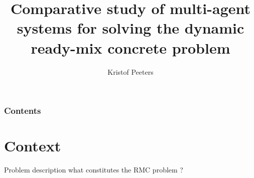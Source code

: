 \documentclass[dvipsnames,handout]{beamer}
\title{Comparative study of multi-agent systems for solving the dynamic
ready-mix concrete problem}
\author{Kristof Peeters}
\date{}
\institute{KU Leuven}
\begin{document}
\begin{frame}[plain]
\titlepage
\end{frame}


\begin{frame}
\frametitle{Contents}
\tableofcontents
\end{frame}

\section{Context}

\begin{frame}{Problem description}
what constitutes the RMC problem ? 
\noindent
\begin{minipage}{\textwidth}
  \centering
  \hspace*{.05in}
\end{minipage}
\end{frame}
\end{document}
